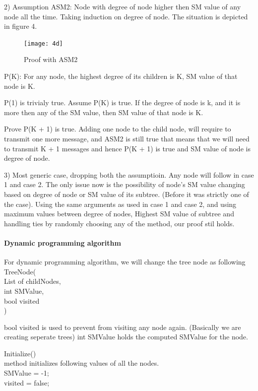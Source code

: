 2) Assumption ASM2: Node with degree of node higher then SM value of any node all the time. 
Taking induction on degree of node. The situation is depicted in figure 4. 

\begin{figure}[4d]
    \centering
    \texttt{[image: 4d]}
    \caption{Proof with ASM2}
\end{figure}
 
P(K): For any node, the highest degree of  its children is K, SM value of that node is K. 

P(1) is trivialy true. 
Assume P(K) is true. If the degree of node is k, and it is more then any of the SM value, then SM value of that node is K.  

Prove P(K + 1) is true. 
Adding one node to the child node, will require to transmit one more message, and ASM2 is still true that means that we will need to transmit K + 1 messages and hence P(K + 1) is true and SM value of node is degree of node.  

3) Most generic case, dropping both the assumptioin. 
Any node will follow in case 1 and case 2. The only issue now is the possibility of node's SM value changing based on degree of node or SM value of its subtree. (Before it was strictly one of the case). Using the same arguments as used in case 1 and case 2, and using maximum values between {degree of nodes, Highest SM  value of subtree} and handling ties by randomly choosing any of the method, our proof stil holds. 

\paragraph{Dynamic programming algorithm}
For dynamic programming algorithm, we will change the tree node as following \\
TreeNode(\\
List of childNodes,  \\
int SMValue, \\
bool visited \\
)

bool visited is used to prevent from visiting any node again. (Basically we are creating seperate trees)
int SMValue holds the computed SMValue for the node. 

Initialize() \\
method initializes following values of all the nodes. \\
SMValue = -1; \\
visited = false;\\


